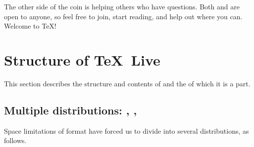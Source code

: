 \documentclass{article}
\begin{document}
The other side of the coin is helping others who have questions.  Both
 and  are open to anyone, so feel
free to join, start reading, and help out where you can.  Welcome to
\TeX{}!


\section{Structure of \protect\TeX\protect\ Live}
\label{sec:struct-tl}

This section describes the structure and contents of \TL{} and the
\TK{} of which it is a part.

\subsection{Multiple distributions: \protect{},
            \protect{},
            \protect{}}
\label{sec:multiple-dist}

Space limitations of  format have forced us to divide
\TK{} into several distributions, as follows.
\end{document}
